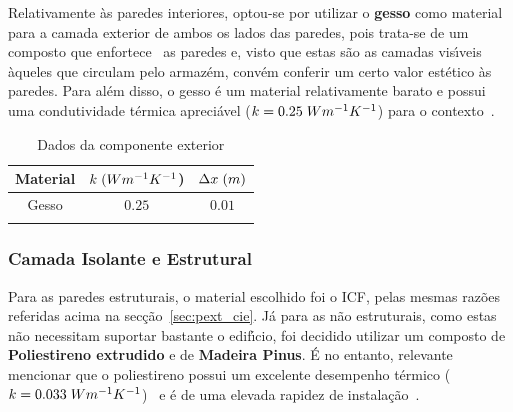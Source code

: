 \documentclass[12pt, a4paper]{article}
\begin{document}
Relativamente \`as paredes interiores, optou-se por utilizar o \textbf{gesso} como material
para a camada exterior de ambos os lados das paredes, pois trata-se de um composto que
enfortece~\cite{gesso_vantagens} as paredes e, visto que estas s\~ao as camadas
vis\'{\i}veis \`aqueles que circulam pelo armaz\'em, conv\'em conferir um certo
valor est\'etico \`as paredes. Para al\'em disso, o gesso \'e um material relativamente barato
e possui uma condutividade t\'ermica apreci\'avel ($ k = 0.25 \hspace{1mm} Wm^{-1}K^{-1} $)
para o contexto~\cite{gesso_k}.

\begin{table}[htpb]
    \begin{center}
        \begin{tabular}{c c c}
            \toprule{}
            Material & $ k \hspace{1mm} (Wm^{-1}K^{-1}$) & $ \Delta x \hspace{1mm} (m)$ \\
            \midrule{}
            Gesso & $0.25$ & $0.01$ \\
            \bottomrule{}
        \end{tabular}
    \end{center}
    \caption{Dados da componente exterior}\label{tab:parede_int_ext}
\end{table}


\subsubsection{Camada Isolante e Estrutural}\label{ssub:paredes_int_isolante}

Para as paredes estruturais, o material escolhido foi o ICF, pelas mesmas raz\~oes referidas
acima na sec\c{c}\~ao~\ref{sec:pext_cie}.
J\'a para as n\~ao estruturais, como estas n\~ao necessitam suportar bastante o edif\'{\i}cio,
foi decidido utilizar um composto de \textbf{Poliestireno extrudido} e de
\textbf{Madeira Pinus}. \'E no entanto, relevante mencionar que o poliestireno possui um
excelente desempenho t\'ermico ($ k = 0.033 \hspace{1mm} Wm^{-1}K^{-1} $)~\cite{poliestireno_k}
e \'e de uma elevada rapidez de instala\c{c}\~ao~\cite{poliestireno}.
\end{document}
